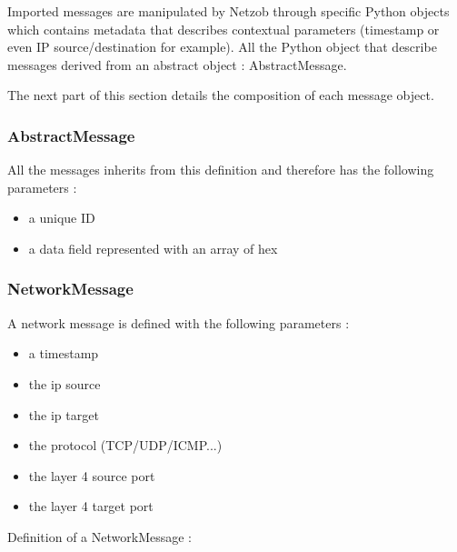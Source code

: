 \documentclass[letterpaper,10pt,english]{sphinxmanual}
\begin{document}
Imported messages are manipulated by Netzob through specific Python
objects which contains metadata that describes contextual parameters
(timestamp or even IP source/destination for example). All the Python
object that describe messages derived from an abstract object :
AbstractMessage.

The next part of this section details the composition of each message
object.


\subsubsection{AbstractMessage}
\label{import/index:abstractmessage}
All the messages inherits from this definition and therefore has the following parameters :
\begin{itemize}
\item {} 
a unique ID

\item {} 
a data field represented with an array of hex

\end{itemize}


\subsubsection{NetworkMessage}
\label{import/index:networkmessage}
A network message is defined with the following parameters :
\begin{itemize}
\item {} 
a timestamp

\item {} 
the ip source

\item {} 
the ip target

\item {} 
the protocol (TCP/UDP/ICMP...)

\item {} 
the layer 4 source port

\item {} 
the layer 4 target port

\end{itemize}

Definition of a NetworkMessage :
\end{document}
